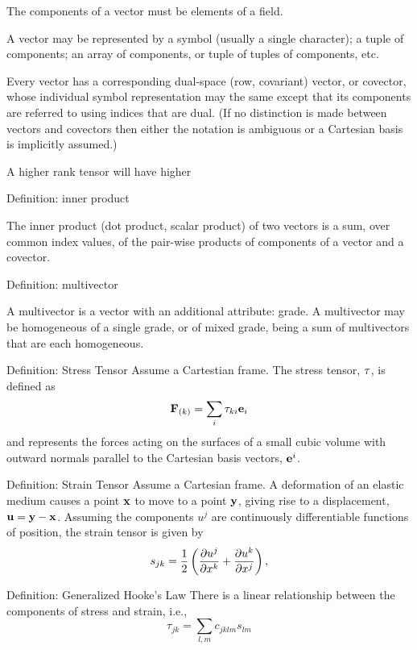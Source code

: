 \documentclass{llncs}
\begin{document}
The components of a vector must be elements of a field.

A vector may be represented by a symbol (usually a single character);
a tuple of components; an array of components, or tuple of tuples of
components, etc.

Every vector has a corresponding dual-space (row, covariant) vector,
or covector, whose individual symbol representation may the same
except that its components are referred to using indices that are
dual.
(If no distinction is made between vectors and covectors then either
the notation is ambiguous or a Cartesian basis is implicitly assumed.)


A higher rank tensor will have higher

Definition: inner product

The inner product (dot product, scalar product) of two vectors is a
sum, over common index values, of the pair-wise products of components
of a vector and a covector.


Definition: multivector

A multivector is a vector with an additional attribute: grade. A
multivector may be homogeneous of a single grade, or of mixed grade,
being a sum of multivectors that are each homogeneous.




Definition: Stress Tensor
Assume a Cartestian frame.
The stress tensor, ${\bf \tau}$, is defined as
\begin{equation}
{\bf F}_{\left( k \right)} = \sum_i \tau_{ki} {\bf e}_i
\end{equation}
and represents the forces acting on the surfaces of a small cubic
volume with outward normals parallel to the Cartesian basis vectors,
${\bf e}^i$.

Definition: Strain Tensor
Assume a Cartesian frame.
A deformation of an elastic medium causes a point ${\bf x}$ to move to
a point ${\bf y}$, giving rise to a displacement,
${\bf u} = {\bf y}-{\bf x}$. Assuming the components $u^j$ are
continuously differentiable functions of position, the strain tensor
is given by
\begin{equation}
s_{jk} = {1 \over 2}
\left(
{\partial u^j \over \partial x^k} +
{\partial u^k \over \partial x^j}
\right),
\end{equation}

Definition: Generalized Hooke's Law
There is a linear relationship between the components of stress and
strain, i.e.,
\begin{equation}
\tau_{jk} = \sum_{l,m} c_{jklm} s_{lm}
\end{equation}
\end{document}
